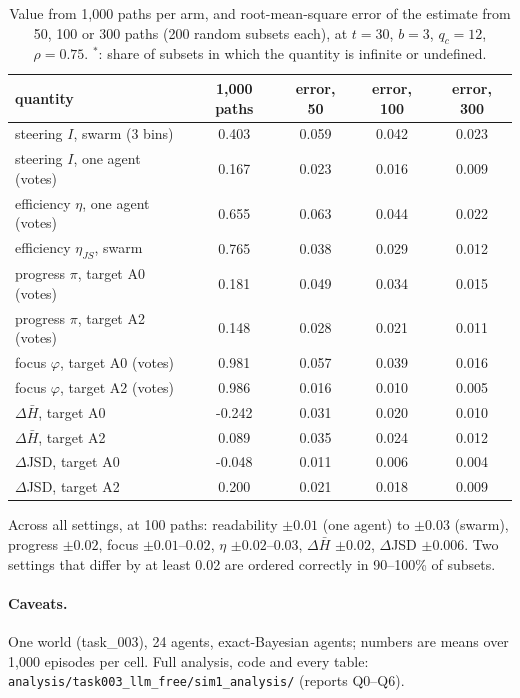 \documentclass[10pt,a4paper]{article}
\begin{document}
\begin{table}[H]
\centering\small
\caption{Value from 1{,}000 paths per arm, and root-mean-square error of the estimate from 50, 100
or 300 paths (200 random subsets each), at $t = 30$, $b = 3$, $q_c = 12$, $\rho = 0.75$. $^\ast$: share of subsets in which
the quantity is infinite or undefined.}
\label{tab:effprec}
\begin{tabular}{lcccc}
\toprule
quantity & 1{,}000 paths & error, 50 & error, 100 & error, 300 \\
\midrule
steering $I$, swarm (3 bins) & 0.403 & 0.059 & 0.042 & 0.023 \\
steering $I$, one agent (votes) & 0.167 & 0.023 & 0.016 & 0.009 \\
efficiency $\eta$, one agent (votes) & 0.655 & 0.063 & 0.044 & 0.022 \\
efficiency $\eta_{JS}$, swarm & 0.765 & 0.038 & 0.029 & 0.012 \\
progress $\pi$, target A0 (votes) & 0.181 & 0.049 & 0.034 & 0.015 \\
progress $\pi$, target A2 (votes) & 0.148 & 0.028 & 0.021 & 0.011 \\
focus $\varphi$, target A0 (votes) & 0.981 & 0.057 & 0.039 & 0.016 \\
focus $\varphi$, target A2 (votes) & 0.986 & 0.016 & 0.010 & 0.005 \\
$\Delta\bar H$, target A0 & -0.242 & 0.031 & 0.020 & 0.010 \\
$\Delta\bar H$, target A2 & 0.089 & 0.035 & 0.024 & 0.012 \\
$\Delta$JSD, target A0 & -0.048 & 0.011 & 0.006 & 0.004 \\
$\Delta$JSD, target A2 & 0.200 & 0.021 & 0.018 & 0.009 \\
\bottomrule
\end{tabular}
\end{table}

\noindent Across all settings, at 100 paths: readability $\pm0.01$ (one agent) to $\pm0.03$ (swarm),
progress $\pm0.02$, focus $\pm0.01$--$0.02$, $\eta$ $\pm0.02$--$0.03$, $\Delta\bar H$ $\pm0.02$, $\Delta$JSD
$\pm0.006$. Two settings that differ by at least 0.02 are ordered correctly in 90--100\% of subsets.

\paragraph{Caveats.} One world (task\_003), 24 agents, exact-Bayesian agents; numbers
are means over 1,000 episodes per cell. Full analysis, code and every table:
\texttt{analysis/task003\_llm\_free/sim1\_analysis/} (reports Q0--Q6).
\end{document}
